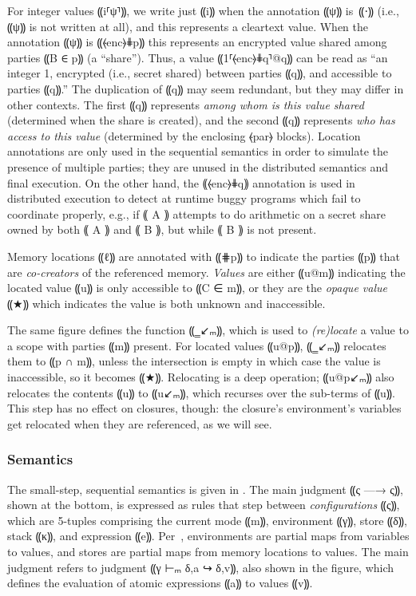 For integer values ⸨i⸢ψ⸣⸩, we write just ⸨i⸩ when the annotation ⸨ψ⸩ is~⸨⋅⸩
(i.e., ⸨ψ⸩ is not written at all), and this represents a cleartext value. When
the annotation ⸨ψ⸩ is ⸨⦑enc⦒⋕p⸩ this represents an encrypted value shared among
parties ⸨B ∈ p⸩ (a ``share''). Thus, a value ⸨1⸢⦑enc⦒⋕q⸣@q⸩ can be read as “an
integer 1, encrypted (i.e., secret shared) between parties ⸨q⸩, and accessible to parties
⸨q⸩.” The duplication of ⸨q⸩ may seem redundant, but they may differ
in other contexts. The first ⸨q⸩ represents \emph{among whom is this value shared}
(determined when the share is created), and the second ⸨q⸩ represents
\emph{who has access to this value} (determined by the enclosing ⦑par⦒ blocks).
Location annotations are only used in the sequential semantics in order to
simulate the presence of multiple parties; they are unused in the distributed
semantics and final execution. On the other hand, the ⸨⦑enc⦒⋕q⸩ annotation is
used in distributed execution to detect at runtime buggy programs which fail to
coordinate properly, e.g., if ⸨ A ⸩ attempts to do arithmetic on a secret share
owned by both ⸨ A ⸩ and ⸨ B ⸩, but while ⸨ B ⸩ is not present.

Memory locations ⸨ℓ⸩ are annotated with ⸨⋕p⸩ to indicate the parties
⸨p⸩ that are \emph{co-creators} of the referenced memory. \emph{Values}
are either ⸨u@m⸩ indicating the located value ⸨u⸩ is only accessible to ⸨C ∈ m⸩,
or they are the \emph{opaque value} ⸨★⸩ which indicates the value is both
unknown and inaccessible.

The same figure defines the function ⸨‗↙ₘ⸩, which is used to \emph{(re)locate} a
value to a scope with parties ⸨m⸩ present. For located values ⸨u@p⸩, ⸨‗↙ₘ⸩
relocates them to ⸨p ∩ m⸩, unless the intersection is empty in which case the
value is inaccessible, so it becomes ⸨★⸩. Relocating is a deep operation;
⸨u@p↙ₘ⸩ also relocates the contents ⸨u⸩ to ⸨u↙ₘ⸩, which recurses over
the sub-terms of ⸨u⸩. This step has no effect on closures, though: the closure's
environment's variables get relocated when they are referenced, as we will see.


\subsubsection{Semantics}
\label{subsubsec:mpc-design-seq-sem}

The small-step, sequential semantics is given in . The
main judgment ⸨ς —→ ς⸩, shown at the bottom, is expressed as rules that step
between \emph{configurations} ⸨ς⸩, which are 5-tuples comprising the current
mode ⸨m⸩, environment ⸨γ⸩, store ⸨δ⸩, stack ⸨κ⸩, and expression ⸨e⸩.
Per~, environments are partial maps from variables to
values, and stores are partial maps from memory locations to values. The main
judgment refers to judgment ⸨γ ⊢ₘ δ,a ↪ δ,v⸩, also shown in the figure, which
defines the evaluation of atomic expressions ⸨a⸩ to values ⸨v⸩.

